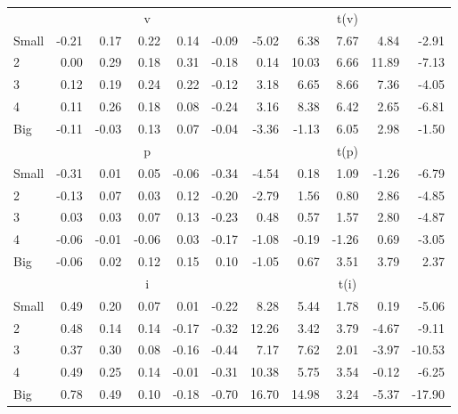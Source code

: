 \begin{table}[!ht]
\begin{tabular}{lrrrrrrrrrr}
  
     & \multicolumn{5}{c}{v} & \multicolumn{5}{c}{t(v)}   \\
     \cmidrule(r){2-6} \cmidrule(r){7-11} 
    Small  & -0.21  & 0.17  & 0.22  & 0.14  & -0.09  & -5.02  & 6.38  & 7.67  & 4.84  & -2.91   \\
    2  & 0.00  & 0.29  & 0.18  & 0.31  & -0.18  & 0.14  & 10.03  & 6.66  & 11.89  & -7.13   \\
    3  & 0.12  & 0.19  & 0.24  & 0.22  & -0.12  & 3.18  & 6.65  & 8.66  & 7.36  & -4.05   \\
    4  & 0.11  & 0.26  & 0.18  & 0.08  & -0.24  & 3.16  & 8.38  & 6.42  & 2.65  & -6.81   \\
    Big  & -0.11  & -0.03  & 0.13  & 0.07  & -0.04  & -3.36  & -1.13  & 6.05  & 2.98  & -1.50   \\
    
  
     & \multicolumn{5}{c}{p} & \multicolumn{5}{c}{t(p)}   \\
     \cmidrule(r){2-6} \cmidrule(r){7-11} 
    Small  & -0.31  & 0.01  & 0.05  & -0.06  & -0.34  & -4.54  & 0.18  & 1.09  & -1.26  & -6.79   \\
    2  & -0.13  & 0.07  & 0.03  & 0.12  & -0.20  & -2.79  & 1.56  & 0.80  & 2.86  & -4.85   \\
    3  & 0.03  & 0.03  & 0.07  & 0.13  & -0.23  & 0.48  & 0.57  & 1.57  & 2.80  & -4.87   \\
    4  & -0.06  & -0.01  & -0.06  & 0.03  & -0.17  & -1.08  & -0.19  & -1.26  & 0.69  & -3.05   \\
    Big  & -0.06  & 0.02  & 0.12  & 0.15  & 0.10  & -1.05  & 0.67  & 3.51  & 3.79  & 2.37   \\
    
  
     & \multicolumn{5}{c}{i} & \multicolumn{5}{c}{t(i)}   \\
     \cmidrule(r){2-6} \cmidrule(r){7-11} 
    Small  & 0.49  & 0.20  & 0.07  & 0.01  & -0.22  & 8.28  & 5.44  & 1.78  & 0.19  & -5.06   \\
    2  & 0.48  & 0.14  & 0.14  & -0.17  & -0.32  & 12.26  & 3.42  & 3.79  & -4.67  & -9.11   \\
    3  & 0.37  & 0.30  & 0.08  & -0.16  & -0.44  & 7.17  & 7.62  & 2.01  & -3.97  & -10.53   \\
    4  & 0.49  & 0.25  & 0.14  & -0.01  & -0.31  & 10.38  & 5.75  & 3.54  & -0.12  & -6.25   \\
    Big  & 0.78  & 0.49  & 0.10  & -0.18  & -0.70  & 16.70  & 14.98  & 3.24  & -5.37  & -17.90   \\
    
  
  \bottomrule
\end{tabular}
\label{tbl:25_Size_Inv_F16}
\end{table}